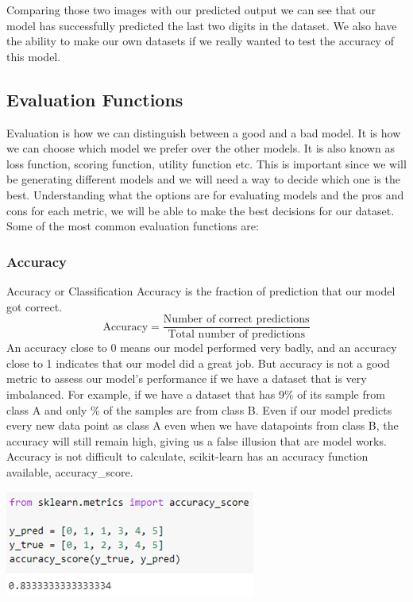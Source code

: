 \documentclass[a4paper,12pt]{report}
\begin{document}
Comparing those two images with our predicted output we can see that our model has successfully predicted the last two digits in the dataset. We also have the ability to make our own datasets if we really wanted to test the accuracy of this model.

\subsection{Evaluation Functions}

Evaluation is how we can distinguish between a good and a bad model. It is how we can choose which model we prefer over the other models. It is also known as loss function, scoring function, utility function etc. This is important since we will be generating different models and we will need a way to decide which one is the best. Understanding what the options are for evaluating models and the pros and cons for each metric, we will be able to make the best decisions for our dataset. Some of the most common evaluation functions are:

\subsubsection{Accuracy}

Accuracy or Classification Accuracy is the fraction of prediction that our model got correct.
$$\text{Accuracy}=\frac{\text{Number of correct predictions}}{\text{Total number of predictions}}$$
An accuracy close to 0 means our model performed very badly, and an accuracy close to 1 indicates that our model did a great job. But accuracy is not a good metric to assess our model’s performance if we have a dataset that is very imbalanced. For example, if we have a dataset that has 9\% of its sample from class A and only \% of the samples are from class B. Even if our model predicts every new data point as class A even when we have datapoints from class B, the accuracy will still remain high, giving us a false illusion that are model works. Accuracy is not difficult to calculate, scikit-learn has an accuracy function available, accuracy\_score.

\begin{center}
    \captionsetup{type=figure}
    \includegraphics[width=.7\linewidth]{media/AccuracyScore.png}
    \label{fig:AccuracyScore}
\end{center}
\end{document}
